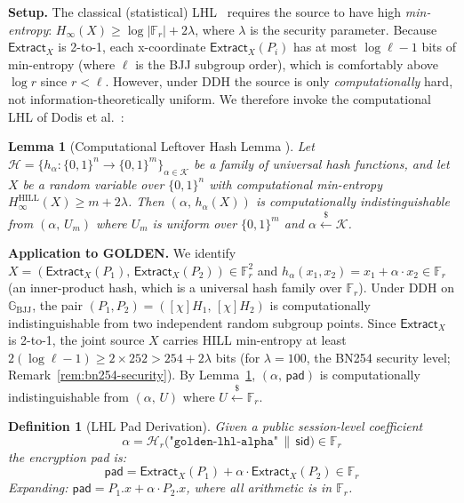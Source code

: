 \documentclass[11pt,a4paper]{article}
\newtheorem{definition}{Definition}[section]
\newtheorem{lemma}[theorem]{Lemma}
\newcommand{\F}{\mathbb{F}}
\newcommand{\G}{\mathbb{G}}
\newcommand{\Gbj}{\G_{\mathrm{BJJ}}}
\newcommand{\Fr}{\F_r}
\newcommand{\sid}{\mathsf{sid}}
\newcommand{\pad}{\mathsf{pad}}
\newcommand{\hash}{\mathcal{H}}
\newcommand{\Extract}{\mathsf{Extract}_X}
\newcommand{\dhx}{\chi}
\newcommand{\getsr}{\xleftarrow{\$}}
\begin{document}
\medskip\noindent
\textbf{Setup.} The classical (statistical) LHL~\cite{ill1989} requires the
source to have high \emph{min-entropy}: $H_\infty(X) \ge \log|\Fr| + 2\lambda$,
where $\lambda$ is the security parameter. Because $\Extract$ is 2-to-1,
each x-coordinate $\Extract(P_i)$ has at most $\log\ell - 1$ bits of
min-entropy (where $\ell$ is the BJJ subgroup order), which is
comfortably above $\log r$ since $r < \ell$. However, under DDH the source
is only \emph{computationally} hard, not information-theoretically uniform.
We therefore invoke the computational LHL of Dodis et al.~\cite{dodis2008}:

\begin{lemma}[Computational Leftover Hash Lemma {\cite[Lemma~2.4]{dodis2008}}]
  \label{lem:clhl}
  Let $\mathcal{H} = \{h_\alpha : \{0,1\}^n \to \{0,1\}^m\}_{\alpha \in \mathcal{K}}$
  be a family of universal hash functions, and let $X$ be a random variable
  over $\{0,1\}^n$ with \emph{computational} min-entropy
  $H_\infty^{\mathrm{HILL}}(X) \ge m + 2\lambda$. Then
  $(\alpha,\, h_\alpha(X))$ is computationally indistinguishable from
  $(\alpha,\, U_m)$ where $U_m$ is uniform over $\{0,1\}^m$ and $\alpha
  \getsr \mathcal{K}$.
\end{lemma}

\noindent\textbf{Application to GOLDEN.}
We identify $X = (\Extract(P_1),\, \Extract(P_2)) \in \Fr^2$ and
$h_\alpha(x_1, x_2) = x_1 + \alpha \cdot x_2 \in \Fr$ (an inner-product
hash, which is a universal hash family over $\Fr$). Under DDH on $\Gbj$,
the pair $(P_1, P_2) = ([\dhx]H_1,\, [\dhx]H_2)$ is computationally
indistinguishable from two independent random subgroup points. Since
$\Extract$ is 2-to-1, the joint source $X$ carries HILL min-entropy
at least $2(\log\ell - 1) \ge 2 \times 252 > 254 + 2\lambda$ bits
(for $\lambda = 100$, the BN254 security level; Remark~\ref{rem:bn254-security}).
By Lemma~\ref{lem:clhl}, $(\alpha,\, \pad)$ is computationally
indistinguishable from $(\alpha,\, U)$ where $U \getsr \Fr$.

\begin{definition}[LHL Pad Derivation]
  \label{def:pad}
  Given a public session-level coefficient
  \begin{equation}
    \alpha = \hash_r\bigl(\texttt{"golden-lhl-alpha"} \,\|\, \sid\bigr) \in \Fr
    \label{eq:alpha}
  \end{equation}
  the encryption pad is:
  \begin{equation}
    \pad = \Extract(P_1) + \alpha \cdot \Extract(P_2) \in \Fr
    \label{eq:pad}
  \end{equation}
  Expanding: $\pad = P_1.x + \alpha \cdot P_2.x$, where all arithmetic is in
  $\Fr$.
\end{definition}
\end{document}
